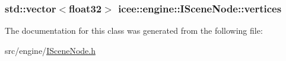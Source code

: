 \label{classicee_1_1engine_1_1ISceneNode_a6aa82e2a759e759edb3273d129fdb222}
\hypertarget{classicee_1_1engine_1_1ISceneNode_ae3d0e1a251ee6ee09557f6cf7998c738}{
\subsubsection[{vertices}]{\setlength{\rightskip}{0pt plus 5cm}std::vector$<${\bf float32}$>$ {\bf icee::engine::ISceneNode::vertices}}}
\label{classicee_1_1engine_1_1ISceneNode_ae3d0e1a251ee6ee09557f6cf7998c738}


The documentation for this class was generated from the following file:\begin{DoxyCompactItemize}
\item 
src/engine/\hyperlink{ISceneNode_8h}{ISceneNode.h}\end{DoxyCompactItemize}
